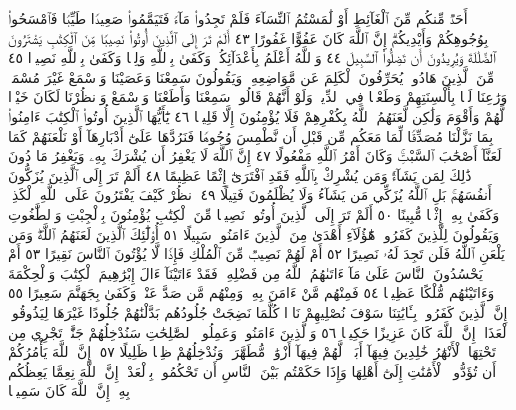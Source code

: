 أَحَدࣱ مِّنكُم مِّنَ ٱلْغَآئِطِ أَوْ لَٰمَسْتُمُ ٱلنِّسَآءَ فَلَمْ تَجِدُوا۟ مَآءࣰ
فَتَيَمَّمُوا۟ صَعِيدࣰا طَيِّبࣰا فَٱمْسَحُوا۟ بِوُجُوهِكُمْ وَأَيْدِيكُمْۗ
إِنَّ ٱللَّهَ كَانَ عَفُوًّا غَفُورًا ٤٣ أَلَمْ تَرَ إِلَى ٱلَّذِينَ أُوتُوا۟ نَصِيبࣰا مِّنَ
ٱلْكِتَٰبِ يَشْتَرُونَ ٱلضَّلَٰلَةَ وَيُرِيدُونَ أَن تَضِلُّوا۟ ٱلسَّبِيلَ ٤٤
وَٱللَّهُ أَعْلَمُ بِأَعْدَآئِكُمْۚ وَكَفَىٰ بِٱللَّهِ وَلِيࣰّا وَكَفَىٰ بِٱللَّهِ نَصِيرࣰا ٤٥
مِّنَ ٱلَّذِينَ هَادُوا۟ يُحَرِّفُونَ ٱلْكَلِمَ عَن مَّوَاضِعِهِۦ وَيَقُولُونَ
سَمِعْنَا وَعَصَيْنَا وَٱسْمَعْ غَيْرَ مُسْمَعࣲ وَرَٰعِنَا لَيَّۢا بِأَلْسِنَتِهِمْ
وَطَعْنࣰا فِي ٱلدِّينِۚ وَلَوْ أَنَّهُمْ قَالُوا۟ سَمِعْنَا وَأَطَعْنَا وَٱسْمَعْ وَٱنظُرْنَا
لَكَانَ خَيْرࣰا لَّهُمْ وَأَقْوَمَ وَلَٰكِن لَّعَنَهُمُ ٱللَّهُ بِكُفْرِهِمْ فَلَا يُؤْمِنُونَ
إِلَّا قَلِيلࣰا ٤٦ يَٰٓأَيُّهَا ٱلَّذِينَ أُوتُوا۟ ٱلْكِتَٰبَ ءَامِنُوا۟ بِمَا نَزَّلْنَا
مُصَدِّقࣰا لِّمَا مَعَكُم مِّن قَبْلِ أَن نَّطْمِسَ وُجُوهࣰا فَنَرُدَّهَا
عَلَىٰٓ أَدْبَارِهَآ أَوْ نَلْعَنَهُمْ كَمَا لَعَنَّآ أَصْحَٰبَ ٱلسَّبْتِۚ وَكَانَ أَمْرُ
ٱللَّهِ مَفْعُولًا ٤٧ إِنَّ ٱللَّهَ لَا يَغْفِرُ أَن يُشْرَكَ بِهِۦ وَيَغْفِرُ مَا دُونَ
ذَٰلِكَ لِمَن يَشَآءُۚ وَمَن يُشْرِكْ بِٱللَّهِ فَقَدِ ٱفْتَرَىٰٓ إِثْمًا عَظِيمًا ٤٨
أَلَمْ تَرَ إِلَى ٱلَّذِينَ يُزَكُّونَ أَنفُسَهُمۚ بَلِ ٱللَّهُ يُزَكِّي مَن يَشَآءُ
وَلَا يُظْلَمُونَ فَتِيلًا ٤٩ ٱنظُرْ كَيْفَ يَفْتَرُونَ عَلَى ٱللَّهِ ٱلْكَذِبَۖ
وَكَفَىٰ بِهِۦٓ إِثْمࣰا مُّبِينًا ٥٠ أَلَمْ تَرَ إِلَى ٱلَّذِينَ أُوتُوا۟ نَصِيبࣰا
مِّنَ ٱلْكِتَٰبِ يُؤْمِنُونَ بِٱلْجِبْتِ وَٱلطَّٰغُوتِ وَيَقُولُونَ
لِلَّذِينَ كَفَرُوا۟ هَٰٓؤُلَآءِ أَهْدَىٰ مِنَ ٱلَّذِينَ ءَامَنُوا۟ سَبِيلًا ٥١
أُو۟لَٰٓئِكَ ٱلَّذِينَ لَعَنَهُمُ ٱللَّهُۖ وَمَن يَلْعَنِ ٱللَّهُ فَلَن تَجِدَ لَهُۥ نَصِيرًا ٥٢
أَمْ لَهُمْ نَصِيبࣱ مِّنَ ٱلْمُلْكِ فَإِذࣰا لَّا يُؤْتُونَ ٱلنَّاسَ نَقِيرًا ٥٣ أَمْ
يَحْسُدُونَ ٱلنَّاسَ عَلَىٰ مَآ ءَاتَىٰهُمُ ٱللَّهُ مِن فَضْلِهِۦۖ فَقَدْ ءَاتَيْنَآ
ءَالَ إِبْرَٰهِيمَ ٱلْكِتَٰبَ وَٱلْحِكْمَةَ وَءَاتَيْنَٰهُم مُّلْكًا عَظِيمࣰا ٥٤
فَمِنْهُم مَّنْ ءَامَنَ بِهِۦ وَمِنْهُم مَّن صَدَّ عَنْهُۚ وَكَفَىٰ بِجَهَنَّمَ سَعِيرًا ٥٥
إِنَّ ٱلَّذِينَ كَفَرُوا۟ بِـَٔايَٰتِنَا سَوْفَ نُصْلِيهِمْ نَارࣰا كُلَّمَا نَضِجَتْ
جُلُودُهُم بَدَّلْنَٰهُمْ جُلُودًا غَيْرَهَا لِيَذُوقُوا۟ ٱلْعَذَابَۗ إِنَّ ٱللَّهَ كَانَ
عَزِيزًا حَكِيمࣰا ٥٦ وَٱلَّذِينَ ءَامَنُوا۟ وَعَمِلُوا۟ ٱلصَّٰلِحَٰتِ سَنُدْخِلُهُمْ
جَنَّٰتࣲ تَجْرِي مِن تَحْتِهَا ٱلْأَنْهَٰرُ خَٰلِدِينَ فِيهَآ أَبَدࣰاۖ لَّهُمْ فِيهَآ
أَزْوَٰجࣱ مُّطَهَّرَةࣱۖ وَنُدْخِلُهُمْ ظِلࣰّا ظَلِيلًا ٥٧۞ إِنَّ ٱللَّهَ يَأْمُرُكُمْ
أَن تُؤَدُّوا۟ ٱلْأَمَٰنَٰتِ إِلَىٰٓ أَهْلِهَا وَإِذَا حَكَمْتُم بَيْنَ ٱلنَّاسِ أَن
تَحْكُمُوا۟ بِٱلْعَدْلِۚ إِنَّ ٱللَّهَ نِعِمَّا يَعِظُكُم بِهِۦٓۗ إِنَّ ٱللَّهَ كَانَ سَمِيعَۢا
